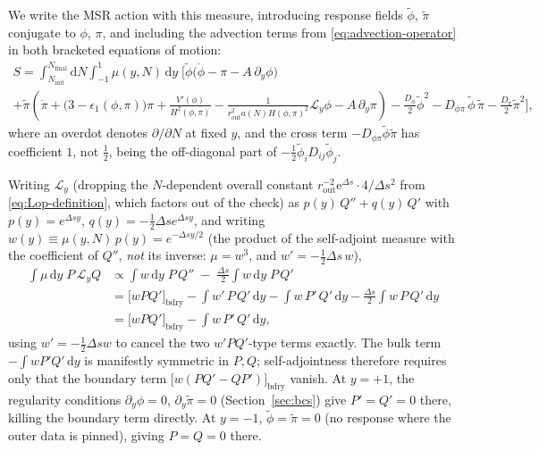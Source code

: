 \documentclass[a4paper,11pt]{article}
\newcommand{\semibold}[1]{{\fontseries{b}\selectfont{#1}}}
\renewcommand{\d}{\mathrm{d}}
\newcommand{\e}[1]{\mathrm{e}^{{#1}}}
\newenvironment{panel}{\begin{tcolorbox}[enhanced,breakable,colback=gray!10,colframe=gray!30]\small}{\end{tcolorbox}}
\newcommand{\Ny}{N}                          %
\newcommand{\Ninit}{N_{\mathrm{init}}}       %
\newcommand{\Nfinal}{N_{\mathrm{final}}}     %
\newcommand{\epsSR}{\epsilon_1}              %
\newcommand{\Hub}{H}                         %
\newcommand{\sfactor}{a}                     %
\newcommand{\atloc}{(\field,\mom)}           %
\newcommand{\field}{\phi}                    %
\newcommand{\mom}{\pi}                       %
\newcommand{\Vpot}{V}                        %
\newcommand{\rfield}{\widetilde\field}       %
\newcommand{\rmom}{\widetilde\mom}           %
\newcommand{\rad}{r}                         %
\newcommand{\yco}{y}                         %
\newcommand{\rout}{\rad_{\mathrm{out}}}      %
\newcommand{\aHloc}{\sfactor(\Ny)\Hub\atloc} %
\newcommand{\Deltas}{\Delta s}                %
\newcommand{\measure}{\mu}                   %
\newcommand{\advcoef}{A}                     %
\newcommand{\weightfn}{w}                    %
\newcommand{\Lop}{\mathcal{L}_\yco}          %
\newcommand{\Dnoise}[1]{D_{#1}}              %
\begin{document}
We write the MSR action with this measure,
introducing response fields $\rfield$, $\rmom$ conjugate to $\field$,
$\mom$, and including the advection terms from \eqref{eq:advection-operator}
in both bracketed equations of motion:
\begin{multline}
    S
    =
    \int_{\Ninit}^{\Nfinal}\! \d\Ny \int_{-1}^1\! \measure(\yco,\Ny)\,\d\yco \; \Bigg[
    \rfield \Big( \dot\field - \mom - \advcoef\,\partial_\yco\field \Big)
    \\
    +
    \rmom \left( \dot\mom + \big(3-\epsSR\atloc\big)\mom + \frac{\Vpot'(\field)}{\Hub^2\atloc}
    - \frac{1}{\rout^2\aHloc^2}\Lop\field - \advcoef\,\partial_\yco\mom \right)
    -
    \frac{\Dnoise{\field}}{2}\rfield^2
    -
    \Dnoise{\field\mom}\,\rfield\,\rmom
    -
    \frac{\Dnoise{\mom}}{2}\rmom^2
    \Bigg] ,
    \label{eq:msr-action}
\end{multline}
where an overdot denotes $\partial/\partial\Ny$ at fixed $\yco$, and the
cross term $-\Dnoise{\field\mom}\rfield\rmom$ has coefficient $1$, not
$\tfrac12$, being the off-diagonal part of $-\tfrac12\rfield_i\Dnoise{ij}\rfield_j$.

\begin{panel}
\semibold{Check of self-adjointness, with the drift term.} Writing $\Lop$
(dropping the $\Ny$-dependent overall constant $\rout^{-2}\e{\Deltas}\cdot4/\Deltas^2$
from \eqref{eq:Lop-definition}, which factors out of the check) as
$p(\yco)\,Q''+q(\yco)\,Q'$ with $p(\yco)=e^{\Deltas\yco}$,
$q(\yco)=-\tfrac12\Deltas e^{\Deltas\yco}$, and writing
$\weightfn(\yco)\equiv \measure(\yco,\Ny)\,p(\yco) = e^{-\Deltas\yco/2}$
(the product of the self-adjoint measure with the coefficient of $Q''$,
\emph{not} its inverse: $\measure=\weightfn^3$, and $\weightfn'=-\tfrac12\Deltas\,\weightfn$),
\begin{align*}
    \int \measure\,\d\yco\; P\,\Lop Q
    & \propto
    \int \weightfn\,\d\yco\;P\,Q'' \;-\; \frac{\Deltas}{2}\int\weightfn\,\d\yco\;P\,Q'
    \\
    & =
    \Big[\weightfn P Q'\Big]_{\mathrm{bdry}} - \int \weightfn'\,P\,Q'\,\d\yco - \int\weightfn\,P'\,Q'\,\d\yco - \frac{\Deltas}{2}\int\weightfn\,P\,Q'\,\d\yco
    \\
    & =
    \Big[\weightfn P Q'\Big]_{\mathrm{bdry}} - \int \weightfn\, P'\,Q'\,\d\yco ,
\end{align*}
using $\weightfn'=-\tfrac12\Deltas\weightfn$ to cancel the two
$\weightfn'PQ'$-type terms exactly. The bulk term $-\int\weightfn P'Q'\,\d\yco$
is manifestly symmetric in $P,Q$; self-adjointness therefore requires only
that the boundary term $\big[\weightfn(PQ'-QP')\big]_{\mathrm{bdry}}$
vanish.
At $\yco=+1$, the regularity conditions $\partial_\yco\field=0$,
$\partial_\yco\rmom=0$ (Section~\ref{sec:bcs}) give $P'=Q'=0$ there,
killing the boundary term directly.
At $\yco=-1$, $\rfield=\rmom=0$ (no response where the outer data
is pinned), giving $P=Q=0$ there.
\end{panel}
\end{document}
